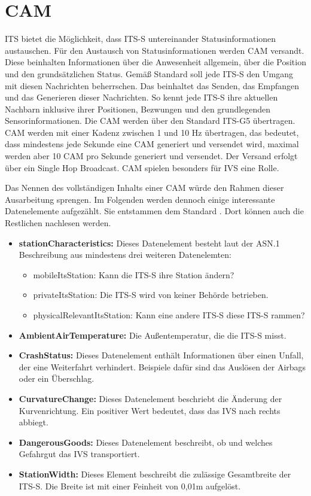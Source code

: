 \section{CAM\label{sec:cam}}
\ac{ITS} bietet die Möglichkeit, dass \ac{ITS-S} untereinander Statusinformationen austauschen. Für den Austausch von Statusinformationen werden \ac{CAM} versandt. Diese beinhalten Informationen über die Anwesenheit allgemein, über die Position und den grundsätzlichen Status. Gemäß Standard \cite{ts102637-2} soll jede \ac{ITS-S} den Umgang mit diesen Nachrichten beherrschen. Das beinhaltet das Senden, das Empfangen und das Generieren dieser Nachrichten. So kennt jede \ac{ITS-S} ihre aktuellen Nachbarn inklusive ihrer Positionen, Bezwungen und den grundlegenden Sensorinformationen. Die \ac{CAM} werden über den Standard \ac{ITS-G5} übertragen. \ac{CAM} werden mit einer Kadenz zwischen 1 und 10 Hz übertragen, das bedeutet, dass mindestens jede Sekunde eine \ac{CAM} generiert und versendet wird, maximal werden aber 10 \ac{CAM} pro Sekunde generiert und versendet. Der Versand erfolgt über ein Single Hop Broadcast. \ac{CAM} spielen besonders für \ac{IVS} eine Rolle.


Das Nennen des vollständigen Inhalts einer \ac{CAM} würde den Rahmen dieser Ausarbeitung sprengen. Im Folgenden werden dennoch einige interessante Datenelemente aufgezählt. Sie entstammen dem Standard \cite{ts102637-2}. Dort können auch die Restlichen nachlesen werden.

\begin{itemize}
	\item \textbf{stationCharacteristics: } Dieses Datenelement besteht laut der \ac{ASN.1} Beschreibung aus mindestens drei weiteren Datenelemten:
	\begin{itemize}
		\item mobileItsStation: Kann die \ac{ITS-S} ihre Station ändern?
		\item privateItsStation: Die \ac{ITS-S} wird von keiner Behörde betrieben.
		\item physicalRelevantItsStation: Kann eine andere \ac{ITS-S} diese \ac{ITS-S} rammen?
	\end{itemize}
	\item \textbf{AmbientAirTemperature: } Die Außentemperatur, die die \ac{ITS-S} misst.
	\item \textbf{CrashStatus: } Dieses Datenelement enthält Informationen über einen Unfall, der eine Weiterfahrt verhindert. Beispiele dafür sind das Auslösen der Airbags oder ein Überschlag.
	\item \textbf{CurvatureChange: } Dieses Datenelement beschriebt die Änderung der Kurvenrichtung. Ein positiver Wert bedeutet, dass das \ac{IVS} nach rechts abbiegt.
	\item  \textbf{DangerousGoods: } Dieses Datenelement beschreibt, ob und welches Gefahrgut  das \ac{IVS} transportiert.
	\item \textbf{StationWidth: } Dieses Element beschreibt die zulässige Gesamtbreite der \ac{ITS-S}. Die Breite ist mit einer Feinheit von 0,01m aufgelöst.
\end{itemize}

